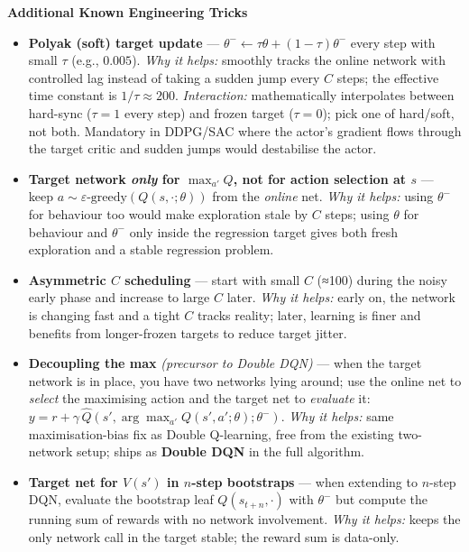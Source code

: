 \documentclass[11pt]{article}
\begin{document}
    \label{tricks-3-2}

    \textbf{Additional Known Engineering Tricks}

\begin{itemize}
\item
  \label{trick-3-2-1}\textbf{Polyak (soft) target update}
  --- \(\theta^-\leftarrow \tau\theta + (1-\tau)\theta^-\) every step
  with small \(\tau\) (e.g., \(0.005\)). \emph{Why it helps:} smoothly
  tracks the online network with controlled lag instead of taking a
  sudden jump every \(C\) steps; the effective time constant is
  \(1/\tau\approx 200\). \emph{Interaction:} mathematically interpolates
  between hard-sync (\(\tau=1\) every step) and frozen target
  (\(\tau=0\)); pick one of hard/soft, not both. Mandatory in DDPG/SAC
  where the actor's gradient flows through the target critic and sudden
  jumps would destabilise the actor.
\item
  \label{trick-3-2-2}\textbf{Target network \emph{only}
  for \(\max_{a'} Q\), not for action selection at \(s\)} --- keep
  \(a\sim\varepsilon\text{-greedy}(Q(s,\cdot;\theta))\) from the
  \emph{online} net. \emph{Why it helps:} using \(\theta^-\) for
  behaviour too would make exploration stale by \(C\) steps; using
  \(\theta\) for behaviour and \(\theta^-\) only inside the regression
  target gives both fresh exploration and a stable regression problem.
\item
  \label{trick-3-2-3}\textbf{Asymmetric \(C\) scheduling}
  --- start with small \(C\) (≈100) during the noisy early phase and
  increase to large \(C\) later. \emph{Why it helps:} early on, the
  network is changing fast and a tight \(C\) tracks reality; later,
  learning is finer and benefits from longer-frozen targets to reduce
  target jitter.
\item
  \label{trick-3-2-4}\textbf{Decoupling the max}
  \emph{(precursor to Double DQN)} --- when the target network is in
  place, you have two networks lying around; use the online net to
  \emph{select} the maximising action and the target net to
  \emph{evaluate} it:
  \(y = r + \gamma\,\hat{Q}(s', \arg\max_{a'} Q(s',a';\theta);\theta^-)\).
  \emph{Why it helps:} same maximisation-bias fix as Double Q-learning,
  free from the existing two-network setup; ships as \textbf{Double DQN}
  in the full algorithm.
\item
  \label{trick-3-2-5}\textbf{Target net for \(V(s')\) in
  \(n\)-step bootstraps} --- when extending to \(n\)-step DQN, evaluate
  the bootstrap leaf \(Q(s_{t+n}, \cdot)\) with \(\theta^-\) but compute
  the running sum of rewards with no network involvement. \emph{Why it
  helps:} keeps the only network call in the target stable; the reward
  sum is data-only.
\end{itemize}
\end{document}

